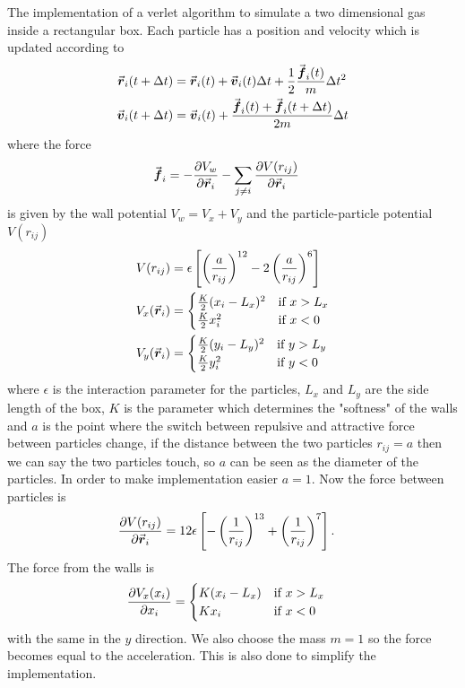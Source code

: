 \documentclass[10pt,a4paper,aps,twocolumn,secnumarabic,numerical,balancelastpage,nofootinbib,superscriptaddress]{revtex4-2}
\begin{document}
		The implementation of a verlet algorithm to simulate a two dimensional gas inside a rectangular box. Each particle has a position and velocity which is updated according to
		\begin{align}
			\va*{r}_i(t+\Delta t)&=\va*{r}_i(t)+\va*{v}_i(t)\Delta t+\frac{1}{2}\frac{\va*{f}_i(t)}{m}\Delta t^2\\
			\va*{v}_i(t+\Delta t)&=\va*{v}_i(t) +\frac{\va*{f}_i(t)+\va*{f}_i(t+\Delta t)}{2m}\Delta t
		\end{align}
		where the force
		\begin{align}
			\va*{f}_i&=-\pdv{V_w}{\va*{r}_i}-\sum_{j\neq i}\pdv{V(r_{ij})}{\va*{r}_i}
		\end{align}
		is given by the wall potential $V_w=V_x+V_y$ and the particle-particle potential $V(r_{ij})$
		\begin{align}
			V(r_{ij})&=\epsilon \left [\left (\frac{a}{r_{ij}}\right )^{12}-2\left (\frac{a}{r_{ij}}\right )^6\right ]\\
			V_x(\va*{r}_i)&=
			\begin{cases}
				\frac{K}{2}(x_i-L_x)^2	&	\text{if }x >L_x\\
				\frac{K}{2}x_i^2	&	\text{if }x < 0
			\end{cases}\\
			V_y(\va*{r}_i)&=
			\begin{cases}
				\frac{K}{2}(y_i-L_y)^2	&	\text{if }y >L_y\\
				\frac{K}{2}y_i^2	&	\text{if }y < 0
			\end{cases}
		\end{align}
		where $\epsilon$ is the interaction parameter for the particles, $L_x$ and $L_y$ are the side length of the box, $K$ is the parameter which determines the "softness" of the walls and $a$ is the point where the switch between repulsive and attractive force between particles change, if the distance between the two particles $r_{ij}=a$ then we can say the two particles touch, so $a$ can be seen as the diameter of the particles. In order to make implementation easier $a=1$. Now the force between particles is
		\begin{align}
			\pdv{V(r_{ij})}{\va*{r}_i}&=12\epsilon\left [-\left (\frac{1}{r_{ij}}\right )^{13}+\left (\frac{1}{r_{ij}}\right )^7\right ].
		\end{align}
		The force from the walls is
		\begin{align}
			\pdv{V_x(x_i)}{x_i}&=
			\begin{cases}
				K(x_i-L_x)	&	\text{if }x > L_x\\
				Kx_i	&	\text{if } x < 0
			\end{cases}
		\end{align}
		with the same in the $y$ direction. We also choose the mass $m=1$ so the force becomes equal to the acceleration. This is also done to simplify the implementation.
\end{document}
